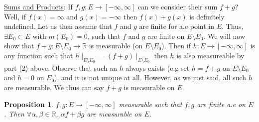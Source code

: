 \documentclass[11pt]{article}
\newtheorem*{prop}{Proposition}
\newcommand{\R}{\mathbb{R}}
\begin{document}
    \underline{Sums and Products}: If $f,g : E \rightarrow [-\infty, \infty]$ can we consider their sum $f+g$?
    Well, if $f(x) = \infty$ and $g(x) = -\infty$ then $f(x) + g(x)$ is definitely undefined.
    Let us then assume that $f$ and $g$ are finite for a.e point in $E$.
    Thus, $\exists E_0 \subset E$ with $m(E_0) = 0$, such that $f$ and $g$ are finite on $E \setminus E_0$.
    We will now show that $f+g: E \setminus E_0 \rightarrow \R$ is measurable (on $E\setminus E_0$).
    Then if $h: E \rightarrow [-\infty, \infty]$ is any function such that $h \mid_{E\setminus E_0} = (f+g)\mid_{E\setminus E_0}$ then $h$ is also measureable by part (2) above.
    Observe that such an $h$ always exists (e.g set $h = f+g$ on $E \setminus E_0$ and $h=0$ on $E_0$), and it is not unique at all.
    However, as we just said, all such $h$ are measurable.
    We thus can say $f+g$ is measurable on $E$.

    \begin{prop}
        $f,g: E \rightarrow [-\infty, \infty]$ measurable such that $f,g$ are finite a.e on $E$.
        Then $\forall \alpha, \beta \in \R$, $\alpha f + \beta g$ are measurable on $E$.
    \end{prop}
\end{document}
